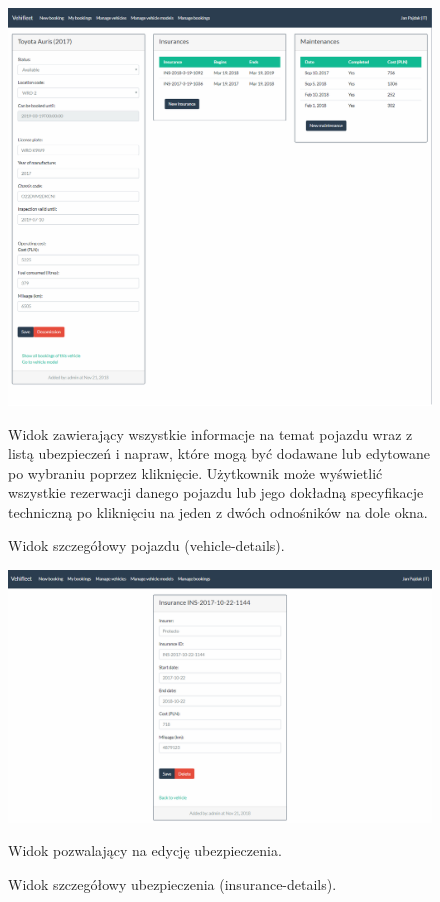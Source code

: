 \documentclass[eng,printmode,openany]{mgr}
\begin{document}
	\begin{figure}[H]
		\centering
		\includegraphics[width=\textwidth]{images/views/vehicle-detail.png}
		\caption{Widok szczegółowy pojazdu (vehicle-details).}
		\small 
		Widok zawierający wszystkie informacje na temat pojazdu wraz z listą ubezpieczeń i napraw, które mogą być dodawane lub edytowane po wybraniu poprzez kliknięcie. Użytkownik może wyświetlić wszystkie rezerwacji danego pojazdu lub jego dokładną specyfikacje techniczną po kliknięciu na jeden z dwóch odnośników na dole okna.
	\end{figure}
	
	\begin{figure}[H]
		\centering
		\includegraphics[width=\textwidth]{images/views/insurance-detail.png}
		\caption{Widok szczegółowy ubezpieczenia (insurance-details).}
		\small 
		Widok pozwalający na edycję ubezpieczenia.
	\end{figure}
	
\end{document}
